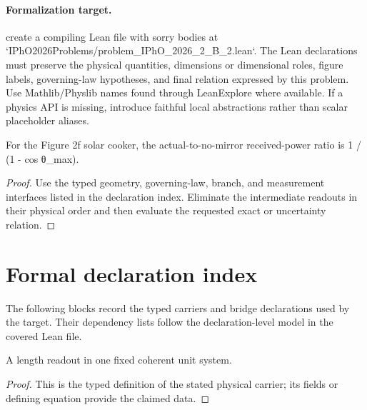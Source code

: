 \paragraph{Formalization target.}
create a compiling Lean file with sorry bodies at `IPhO2026Problems/problem\_IPhO\_2026\_2\_B\_2.lean`. The Lean declarations must preserve the physical quantities, dimensions or dimensional roles, figure labels, governing-law hypotheses, and final relation expressed by this problem.
Use Mathlib/Physlib names found through LeanExplore where available. If a physics API is missing, introduce faithful local abstractions rather than scalar placeholder aliases.

\begin{theorem}
  \label{thm:physics:IPhO_2026_2_B_2:target}
  For the Figure 2f solar cooker, the actual-to-no-mirror received-power ratio is 1 / (1 - cos θ\_max).
\end{theorem}
\begin{proof}
  Use the typed geometry, governing-law, branch, and measurement interfaces listed in the declaration index.  Eliminate the intermediate readouts in their physical order and then evaluate the requested exact or uncertainty relation.
\end{proof}
\section*{Formal declaration index}
The following blocks record the typed carriers and bridge declarations used by the target.  Their dependency lists follow the declaration-level model in the covered Lean file.

\begin{definition}
  \label{def:physics:IPhO_2026_2_B_2:aux001}
  A length readout in one fixed coherent unit system.
\end{definition}
\begin{proof}
  This is the typed definition of the stated physical carrier; its fields or defining equation provide the claimed data.
\end{proof}

